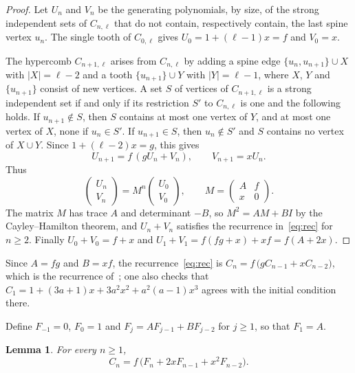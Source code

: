 \documentclass{amsart}
\newtheorem{lemma}[theorem]{Lemma}
\theoremstyle{remark}
\numberwithin{equation}{section}
\begin{document}
\begin{proof}
Let $U_n$ and $V_n$ be the generating polynomials, by size, of the strong
independent sets of $C_{n,\ell}$ that do not contain, respectively contain,
the last spine vertex $u_n$. The single tooth of $C_{0,\ell}$ gives
$U_0=1+(\ell-1)x=f$ and $V_0=x$.

The hypercomb $C_{n+1,\ell}$ arises from $C_{n,\ell}$ by adding a spine edge
$\{u_n,u_{n+1}\}\cup X$ with $|X|=\ell-2$ and a tooth $\{u_{n+1}\}\cup Y$
with $|Y|=\ell-1$, where $X$, $Y$ and $\{u_{n+1}\}$ consist of new vertices.
A set $S$ of vertices of $C_{n+1,\ell}$ is a strong independent set if and
only if its restriction $S'$ to $C_{n,\ell}$ is one and the following holds.
If $u_{n+1}\notin S$, then $S$ contains at most one vertex of $Y$, and at
most one vertex of $X$, none if $u_n\in S'$. If $u_{n+1}\in S$, then
$u_n\notin S'$ and $S$ contains no vertex of $X\cup Y$. Since
$1+(\ell-2)x=g$, this gives
\[
U_{n+1}=f\,(gU_n+V_n),\qquad V_{n+1}=xU_n .
\]
Thus
\[
\begin{pmatrix} U_n\\ V_n\end{pmatrix}
=M^n\begin{pmatrix} U_0\\ V_0\end{pmatrix},\qquad
M=\begin{pmatrix} A & f\\ x & 0\end{pmatrix}.
\]
The matrix $M$ has trace $A$ and determinant $-B$, so $M^2=AM+BI$ by the
Cayley--Hamilton theorem, and $U_n+V_n$ satisfies the recurrence
in~\eqref{eq:rec} for $n\ge 2$. Finally $U_0+V_0=f+x$ and
$U_1+V_1=f(fg+x)+xf=f(A+2x)$.
\end{proof}

Since $A=fg$ and $B=xf$, the recurrence~\eqref{eq:rec} is
$C_n=f\,\bigl(gC_{n-1}+xC_{n-2}\bigr)$, which is the recurrence
of~\cite[Theorem~1.7]{GS}; one also checks that
$C_1=1+(3a+1)x+3a^2x^2+a^2(a-1)x^3$ agrees with the initial condition there.

Define $F_{-1}=0$, $F_0=1$ and $F_j=AF_{j-1}+BF_{j-2}$ for $j\ge 1$, so that
$F_1=A$.

\begin{lemma}\label{lem:cont}
For every $n\ge 1$,
\begin{equation}\label{eq:cont}
C_n=f\,\bigl(F_n+2xF_{n-1}+x^2F_{n-2}\bigr).
\end{equation}
\end{lemma}
\end{document}
